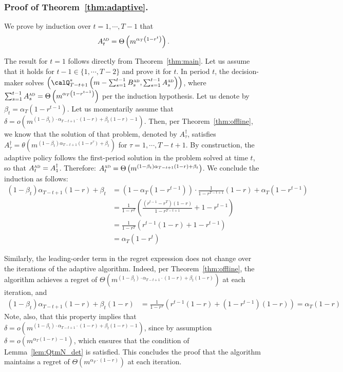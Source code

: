 \documentclass[blindrev]{informs3noheader}
\begin{document}
\subsubsection*{Proof of Theorem~\ref{thm:adaptive}.}

We prove by induction over $t=1,\cdots,T-1$ that $$A^{\textsc{ad}}_t=\Theta\left(m^{\alpha_T\left(1-r^t\right)}\right).$$

The result for $t=1$ follows directly from Theorem~\ref{thm:main}. Let us assume that it holds for $t-1\in\{1,\cdots,T-2\}$ and prove it for $t$. In period $t$, the decision-maker solves $\left(\calQ^*_{T-t+1}\left(m-\sum_{s=1}^{t-1}B^{\textsc{ad}}_s,\sum_{s=1}^{t-1} A^{\textsc{ad}}_s\right)\right)$, where $\sum_{s=1}^{t-1} A^{\textsc{ad}}_s=\Theta\left(m^{\alpha_T\left(1-r^{t-1}\right)}\right)$ per the induction hypothesis. Let us denote by $\beta_t=\alpha_T\left(1-r^{t-1}\right)$. Let us momentarily assume that  $\delta=o\left(m^{(1-\beta_t)\cdot\alpha_{T-t+1}\cdot(1-r)+\beta_t(1-r)-1}\right)$. Then, per Theorem~\ref{thm:offline}, we know that the solution of that problem, denoted by $A^\dagger_\tau$, satisfies 
$A^\dagger_\tau=\theta\left(m^{(1-\beta_t)\alpha_{T-t+1}\left(1-r^\tau\right)+\beta_t}\right)$ for $\tau=1,\cdots,T-t+1$. By construction, the adaptive policy follows the first-period solution in the problem solved at time $t$, so that $A^{\textsc{ad}}_t=A^\dagger_1$. Therefore: $A^{\textsc{ad}}_t=\Theta\left(m^{(1-\beta_t)\alpha_{T-t+1}(1-r)+\beta_t}\right)$. We conclude the induction as follows:
\begin{align*}
(1-\beta_t)\alpha_{T-t+1}(1-r)+\beta_t
&=\left(1-\alpha_T(1-r^{t-1})\right)\cdot\frac{1}{1-r^{T-t+1}}(1-r)+\alpha_T(1-r^{t-1})\\
&=\frac{1}{1-r^T}\left(\frac{(r^{t-1}-r^T)(1-r)}{1-r^{T-t+1}}+1-r^{t-1}\right)\\
&=\frac{1}{1-r^T}\left(r^{t-1}(1-r)+1-r^{t-1}\right)\\
&=\alpha_T(1-r^t)
\end{align*}

Similarly, the leading-order term in the regret expression does not change over the iterations of the adaptive algorithm. Indeed, per Theorem~\ref{thm:offline}, the algorithm achieves a regret of $\Theta\left(m^{(1-\beta_t)\cdot\alpha_{T-t+1}\cdot(1-r)+\beta_t(1-r)}\right)$ at each iteration, and
\begin{align*}
(1-\beta_t)\alpha_{T-t+1}(1-r)+\beta_t(1-r)
&=\frac{1}{1-r^T}\left(r^{t-1}(1-r)+(1-r^{t-1})(1-r)\right)
=\alpha_T(1-r)
\end{align*}
Note, also, that this property implies that $\delta=o\left(m^{(1-\beta_t)\cdot\alpha_{T-t+1}\cdot(1-r)+\beta_t(1-r)-1}\right)$, since by assumption $\delta=o\left(m^{\alpha_T(1-r)-1}\right)$, which ensures that the condition of Lemma~\ref{lem:QtmN_det} is satisfied. This concludes the proof that the algorithm maintains a regret of $\Theta\left(m^{\alpha_T\cdot(1-r)}\right)$ at each iteration.
\end{document}
